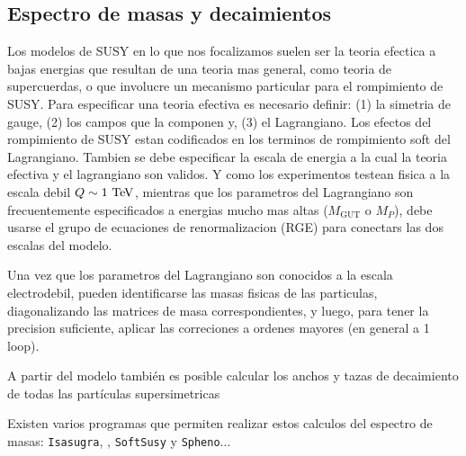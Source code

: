 



\subsection{Espectro de masas y decaimientos}

Los modelos de SUSY en lo que nos focalizamos suelen ser la teoria efectica a
bajas energias que resultan de una teoria mas general, como teoria de
supercuerdas, o que involucre un mecanismo particular para el rompimiento de
SUSY. Para especificar una teoria efectiva es necesario definir: (1) la simetria
de gauge, (2) los campos que la componen y, (3) el Lagrangiano. Los efectos del
rompimiento de SUSY estan codificados en los terminos de rompimiento soft del
Lagrangiano. Tambien se debe especificar la escala de energia a la cual la
teoria efectiva y el lagrangiano son validos. Y como los experimentos testean
fisica a la escala debil $Q\sim 1 \tev$, mientras que los parametros del
Lagrangiano son frecuentemente especificados a energias mucho mas altas
($M_\text{GUT}$ o $M_P$), debe usarse el grupo de ecuaciones de renormalizacion
(RGE) para conectars las dos escalas del modelo.

Una vez que los parametros del Lagrangiano son conocidos a la escala
electrodebil, pueden identificarse las masas fisicas de las particulas,
diagonalizando las matrices de masa correspondientes, y luego, para tener la
precision suficiente, aplicar las correciones a ordenes mayores (en general a 1
loop).

A partir del modelo también es posible calcular los anchos y tazas de decaimiento de todas las
partículas supersimetricas

Existen varios programas que permiten realizar estos calculos del espectro de
masas: \texttt{Isasugra}, \suspect, \texttt{SoftSusy} y \texttt{Spheno}...

